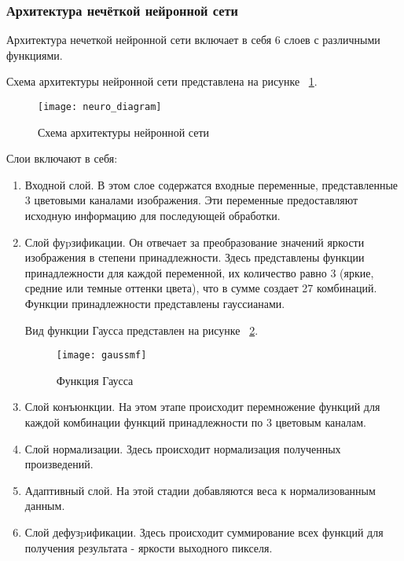 \subsubsection{Архитектура нечёткой нейронной сети}

Архитектура нечеткой нейронной сети включает в себя 6 слоев с различными функциями.

Схема архитектуры нейронной сети представлена на рисунке ~\ref{neuro_diagram:image}.

\begin{figure}[ht]
\texttt{[image: neuro\_diagram]}
\caption{Схема архитектуры нейронной сети}
\label{neuro_diagram:image}
\end{figure}

Слои включают в себя:

\begin{enumerate}
\item Входной слой. В этом слое содержатся входные переменные, представленные 3 цветовыми каналами изображения. Эти переменные предоставляют исходную информацию для последующей обработки.

\item Слой фуpзификации. Он отвечает за преобразование значений яркости изображения в степени принадлежности. Здесь представлены функции принадлежности для каждой переменной, их количество равно 3 (яркие, средние или темные оттенки цвета), что в сумме создает 27 комбинаций. Функции принадлежности представлены гауссианами.

Вид функции Гаусса представлен на рисунке ~\ref{gaussmf:image}.

\begin{figure}[ht]
\texttt{[image: gaussmf]}
\caption{Функция Гаусса}
\label{gaussmf:image}
\end{figure}

\item Слой конъюнкции. На этом этапе происходит перемножение функций для каждой комбинации функций принадлежности по 3 цветовым каналам.

\item Слой нормализации. Здесь происходит нормализация полученных произведений.

\item Адаптивный слой. На этой стадии добавляются веса к нормализованным данным.

\item Слой дефузpификации. Здесь происходит суммирование всех функций для получения результата - яркости выходного пикселя.
\end{enumerate}

